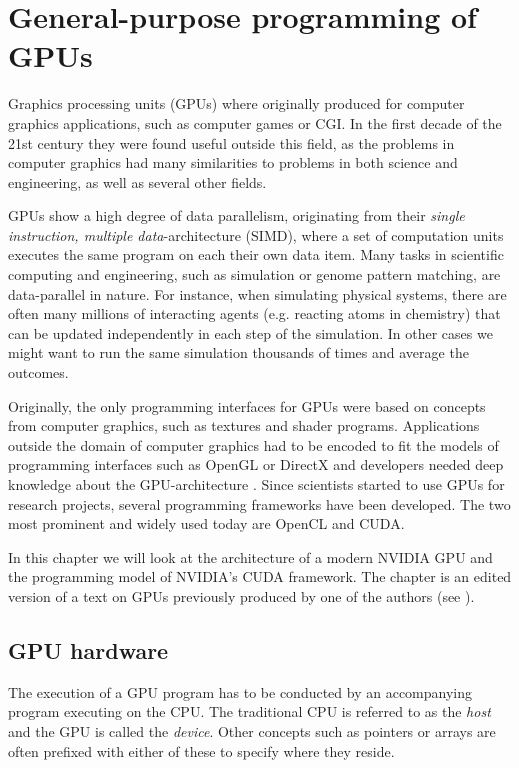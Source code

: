 \chapter{General-purpose programming of GPUs}
\label{chap:gpgpu}
Graphics processing units (GPUs) where originally produced for
computer graphics applications, such as computer games or CGI. In the
first decade of the 21st century they were found useful outside this field,
as the problems in computer graphics had many similarities to problems
in both science and engineering, as well as several other fields.

GPUs show a high degree of data parallelism, originating from their
\textit{single instruction, multiple data}-architecture (SIMD), where
a set of computation units executes the same program on each their own
data item. Many tasks in scientific computing and engineering, such as
simulation or genome pattern matching, are data-parallel in
nature. For instance, when simulating physical systems, there are
often many millions of interacting agents (e.g. reacting atoms in
chemistry) that can be updated independently in each step of the
simulation. In other cases we might want to run the same simulation
thousands of times and average the outcomes.

Originally, the only programming interfaces for GPUs were based on
concepts from computer graphics, such as textures and shader
programs. Applications outside the domain of computer graphics had to
be encoded to fit the models of programming interfaces such as OpenGL
or DirectX and developers needed deep knowledge about the
GPU-architecture \cite{nvidia2009fermi}. Since scientists started to
use GPUs for research projects, several programming frameworks have
been developed. The two most prominent and widely used today are
OpenCL and CUDA.

In this chapter we will look at
the architecture of a modern NVIDIA GPU and the programming model of
NVIDIA's CUDA framework. The chapter is an edited version of a text on
GPUs previously produced by one of the authors (see
\cite{dybdal2011opencl}).

\section{GPU hardware}
\label{sec:gpu_hardware}
The execution of a GPU program has to be conducted by an accompanying
program executing on the CPU. The traditional CPU is referred to as
the \textit{host} and the GPU is called the \textit{device}. Other
concepts such as pointers or arrays are often prefixed with either of
these to specify where they reside.


